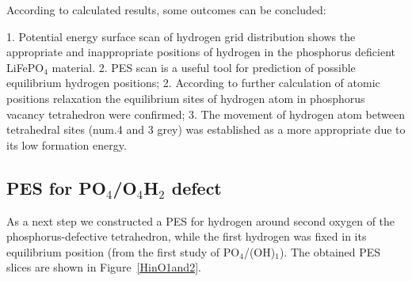According to calculated results, some outcomes can be concluded:

1. Potential energy surface scan of hydrogen grid distribution shows the appropriate and inappropriate positions of hydrogen in the phosphorus deficient LiFePO$_4$ material. 
2. PES scan is a useful tool for  prediction of possible equilibrium hydrogen positions;
2. According to further calculation of atomic positions relaxation the equilibrium sites of hydrogen atom in phosphorus vacancy tetrahedron were confirmed;
3. The movement of hydrogen atom between tetrahedral sites (num.4 and 3 grey) was established as a more appropriate due to its low formation energy. 

\subsection{PES for PO$_4$/O$_4$H$_2$ defect}

As a next step we constructed a PES for hydrogen  around second oxygen of the phosphorus-defective tetrahedron, while the first hydrogen was fixed in its equilibrium position (from the first study of PO$_4$/(OH)$_1$). The obtained PES slices are shown in Figure~\ref{HinO1and2}. 

